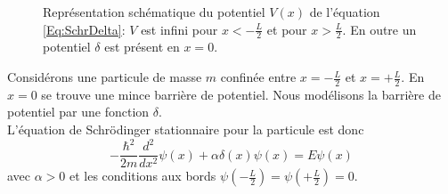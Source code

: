 \begin{figure}[h!]
\centering
{}
\caption{Représentation schématique du potentiel $V(x)$ de l'équation \eqref{Eq:SchrDelta}: $V$ est infini pour $x<-\frac{L}{2}$ et pour $x>\frac{L}{2}$. En outre un potentiel $\delta$ est présent en $x=0$.}
\end{figure}

Considérons une particule de masse $m$ confinée entre $x= -\frac{L}{2}$ et $x =+\frac{L}{2}$. En $x=0$ se trouve une mince barrière de potentiel. Nous modélisons la barrière de potentiel par une fonction $\delta$. \\

L'équation de Schrödinger stationnaire pour la particule est donc
\begin{equation}
-\frac{\hbar^2}{2m} \frac{d^2}{d x^2} \psi(x) + \alpha \delta(x) \psi(x)= E \psi(x)
\label{Eq:SchrDelta}
\end{equation}
avec $\alpha>0$ et les conditions aux bords $\psi(-\frac{L}{2})=\psi(+\frac{L}{2})=0$.







